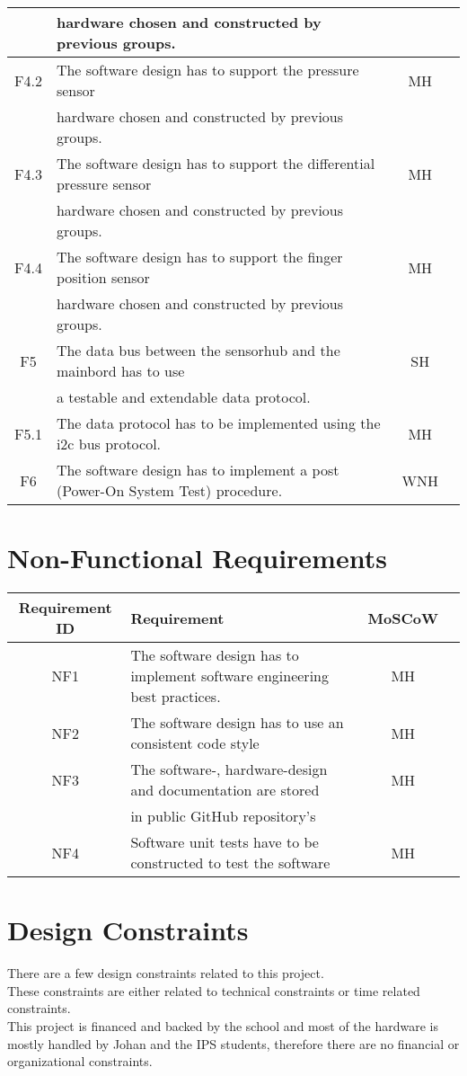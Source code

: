 \begin{tabular}{ |c|l|c|c| }
       & hardware chosen and constructed by previous groups. & \\
\hline
 F4.2  & The software design has to support the pressure sensor & MH \\
       & hardware chosen and constructed by previous groups. & \\
\hline
 F4.3  & The software design has to support the differential pressure sensor & MH \\
       & hardware chosen and constructed by previous groups. & \\
\hline
 F4.4  & The software design has to support the finger position sensor & MH \\
       & hardware chosen and constructed by previous groups. & \\
\hline
 F5    & The data bus between the sensorhub and the mainbord has to use & SH\\
       & a testable and extendable data protocol. &   \\
 \hline
 F5.1  & The data protocol has to be implemented using the i2c bus protocol. & MH \\
 \hline
 F6    & The software design has to implement a post (Power-On System Test) procedure. & WNH \\ 
 \hline
\end{tabular}

\section{Non-Functional Requirements}
\begin{tabular}{ |c|l|c|c| } 
 \hline
 Requirement ID & Requirement & MoSCoW \\ 
 \hline
 \hline
 NF1    & The software design has to implement software engineering best practices.  & MH \\
 \hline
 NF2    & The software design has to use an consistent code style & MH \\
 \hline 
 NF3    & The software-, hardware-design and documentation are stored  & MH \\
        & in public GitHub repository's & \\
\hline
 NF4   & Software unit tests have to be constructed to test the software & MH\\
 \hline
\end{tabular}
\section{Design Constraints}
There are a few design constraints related to this project.\\ 
These constraints are either related to technical constraints or time related constraints. \\ This project is financed and backed by the school and most of the hardware is mostly handled by Johan and the IPS students, therefore there are no financial or organizational constraints.
